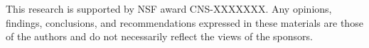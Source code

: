 This research is supported by NSF award CNS-XXXXXXX.%
Any opinions, findings, conclusions, and recommendations expressed in these
materials are those of the authors and do not necessarily reflect the
views of the sponsors.